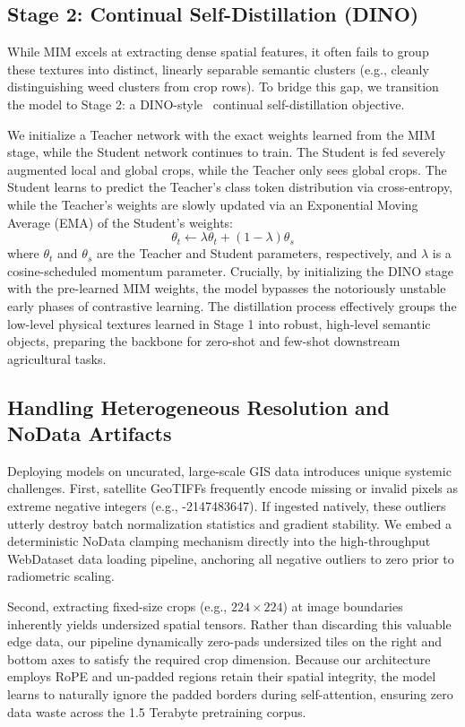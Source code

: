\subsection{Stage 2: Continual Self-Distillation (DINO)}
\label{subsec:dino}

While MIM excels at extracting dense spatial features, it often fails to group these textures into distinct, linearly separable semantic clusters (e.g., cleanly distinguishing weed clusters from crop rows). To bridge this gap, we transition the model to Stage 2: a DINO-style~\cite{caron2021emerging} continual self-distillation objective.

We initialize a Teacher network with the exact weights learned from the MIM stage, while the Student network continues to train. The Student is fed severely augmented local and global crops, while the Teacher only sees global crops. The Student learns to predict the Teacher's class token distribution via cross-entropy, while the Teacher's weights are slowly updated via an Exponential Moving Average (EMA) of the Student's weights:
\begin{equation}
    \theta_t \leftarrow \lambda \theta_t + (1 - \lambda)\theta_s
\end{equation}
where $\theta_t$ and $\theta_s$ are the Teacher and Student parameters, respectively, and $\lambda$ is a cosine-scheduled momentum parameter. 
Crucially, by initializing the DINO stage with the pre-learned MIM weights, the model bypasses the notoriously unstable early phases of contrastive learning. The distillation process effectively groups the low-level physical textures learned in Stage 1 into robust, high-level semantic objects, preparing the backbone for zero-shot and few-shot downstream agricultural tasks.

\subsection{Handling Heterogeneous Resolution and NoData Artifacts}
\label{subsec:heterogeneous_handling}

Deploying models on uncurated, large-scale GIS data introduces unique systemic challenges.
First, satellite GeoTIFFs frequently encode missing or invalid pixels as extreme negative integers (e.g., -2147483647). If ingested natively, these outliers utterly destroy batch normalization statistics and gradient stability. We embed a deterministic NoData clamping mechanism directly into the high-throughput WebDataset data loading pipeline, anchoring all negative outliers to zero prior to radiometric scaling.

Second, extracting fixed-size crops (e.g., $224 \times 224$) at image boundaries inherently yields undersized spatial tensors. Rather than discarding this valuable edge data, our pipeline dynamically zero-pads undersized tiles on the right and bottom axes to satisfy the required crop dimension. Because our architecture employs RoPE and un-padded regions retain their spatial integrity, the model learns to naturally ignore the padded borders during self-attention, ensuring zero data waste across the 1.5 Terabyte pretraining corpus.
